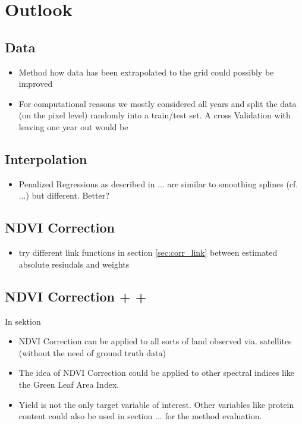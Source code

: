 \chapter{Outlook}

\section{Data}
\begin{itemize}
    \item Method how data has been extrapolated to the grid could possibly be improved
    \item For computational reasons we mostly considered all years and split the data (on the pixel level) randomly into a train/test set. A cross Validation with leaving one year out would be 
\end{itemize}    

\section{Interpolation}
\begin{itemize}
    \item Penalized Regressions as described in ... are similar to smoothing splines (cf. ...) but different. Better?
\end{itemize}    

\section{NDVI Correction}
\begin{itemize}
    \item try different link functions in section \ref{sec:corr_link} between estimated absolute resiudals and weights
\end{itemize}    


\section{NDVI Correction + +}
In sektion
\begin{itemize}
    \item NDVI Correction can be applied to all sorts of land observed via. satellites (without the need of ground truth data)
    \item The idea of NDVI Correction could be applied to other spectral indices like the Green Leaf Area Index.
    \item Yield is not the only target variable of interest. Other variables like protein content could also be used in section ... for the method evaluation. 
\end{itemize}    
